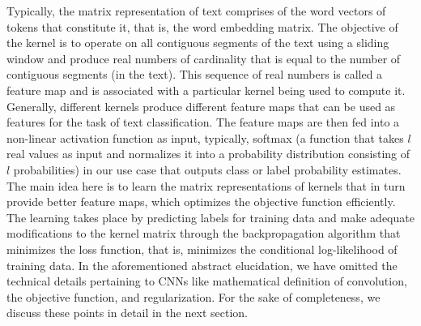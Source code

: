Typically, the matrix representation of text comprises of the word vectors of tokens that constitute it, that is, the word embedding matrix. The objective of the kernel is to operate on all contiguous segments of the text using a sliding window and produce real numbers of cardinality that is equal to the number of contiguous segments (in the text). This sequence of real numbers is called a feature map and is associated with a particular kernel being used to compute it. Generally, different kernels produce different feature maps that can be used as features for the task of text classification. The feature maps are then fed into a non-linear activation function as input, typically, softmax (a function that takes $l$ real values as input and normalizes it into a probability distribution consisting of $l$ probabilities)   in our use case that outputs class or label probability estimates. The main idea here is to learn the matrix representations of kernels that in turn provide better feature maps, which optimizes the objective function efficiently. The learning takes place by predicting labels for training data and make adequate modifications to the kernel matrix through the backpropagation algorithm that minimizes the loss function, that is, minimizes the conditional log-likelihood of training data. In the aforementioned abstract elucidation, we have omitted the technical details pertaining to CNNs like mathematical definition of convolution, the objective function, and regularization. For the sake of completeness, we discuss these points in detail in the next section.

